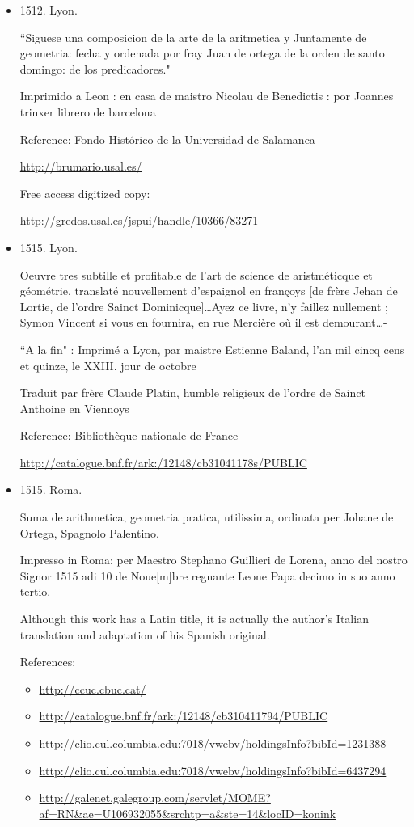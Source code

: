 \documentclass{amsart}
\begin{document}
\begin{itemize}
\item 1512. Lyon.

 ``Siguese una composicion de la arte de la aritmetica y Juntamente de geometria: fecha y ordenada por fray Juan de ortega de la orden de santo domingo: de los predicadores."

 Imprimido a Leon : en casa de maistro Nicolau de Benedictis : por Joannes  trinxer librero de barcelona

Reference: Fondo Hist\'orico de la Universidad de Salamanca

\url{http://brumario.usal.es/}
 
Free access digitized copy:

\url{http://gredos.usal.es/jspui/handle/10366/83271}

\item 1515.  Lyon. 

Oeuvre tres subtille et profitable de l'art de science de aristm\'eticque et g\'eom\'etrie, translat\'e nouvellement d'espaignol en fran\c{c}oys [de fr\`ere Jehan de Lortie, de l'ordre Sainct Dominicque]\ldots Ayez ce livre, n'y faillez nullement ; Symon Vincent si vous en fournira, en rue Merci\`ere o\`u il est demourant\ldots -

``A la fin" : Imprim\'e a Lyon, par maistre Estienne Baland, l'an mil cincq cens et quinze, le XXIII. jour de octobre

 Traduit par fr\`ere Claude Platin, humble religieux de l'ordre de Sainct Anthoine en Viennoys

Reference: Biblioth\`eque nationale de France

\url{http://catalogue.bnf.fr/ark:/12148/cb31041178s/PUBLIC}

\item 1515. Roma.

 Suma de arithmetica, geometria pratica, utilissima, ordinata per Johane de Ortega, Spagnolo Palentino.

Impresso in Roma: per Maestro Stephano Guillieri de Lorena, anno del nostro Signor 1515 adi 10 de Noue[m]bre regnante Leone Papa decimo in suo anno tertio.

    Although this work has a Latin title, it is actually the author's Italian translation and adaptation of his Spanish original.

References:
\begin{itemize}
\item
\url{http://ccuc.cbuc.cat/}
\item
\url{http://catalogue.bnf.fr/ark:/12148/cb310411794/PUBLIC}
\item
 \url{http://clio.cul.columbia.edu:7018/vwebv/holdingsInfo?bibId=1231388}
\item
 \url{http://clio.cul.columbia.edu:7018/vwebv/holdingsInfo?bibId=6437294}
\item
 \url{http://galenet.galegroup.com/servlet/MOME?af=RN&ae=U106932055&srchtp=a&ste=14&locID=konink }
 \end{itemize}


\end{itemize}
\end{document}
